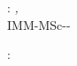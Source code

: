 
\thispagestyle{empty}

\hfill

\vfill

\noindent\myName: \textit{\myTitle,} %
\textcopyright\ \myTime\\
IMM-MSc-\thesisyear-\thesisnumber


\bigskip

\noindent{}: \\
\mySupervisor \\
\myOtherSupervisor




